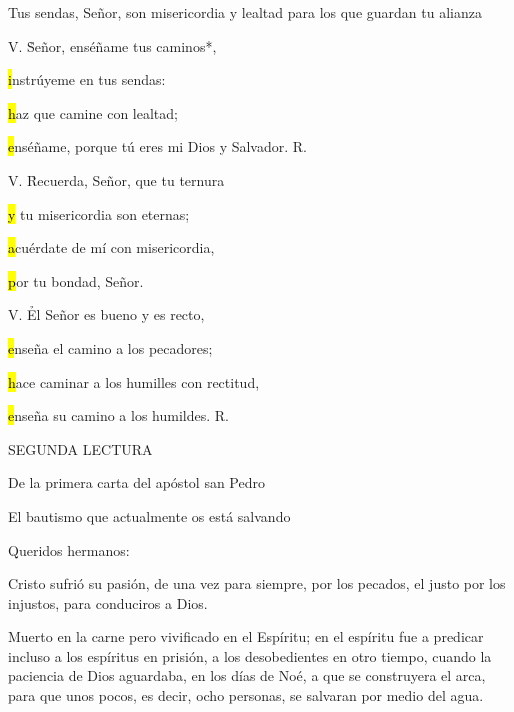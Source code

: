 \begin{readtheme}Tus sendas, Señor, son misericordia y lealtad para los que guardan tu alianza\end{readtheme}

\begin{readbody} 
	\sv V. 	\h Señor, enséñame tus caminos*,\par
			\hl instrúyeme en tus sendas:\par
			\hl haz que camine con lealtad;\par
			\hl enséñame, porque tú eres mi Dios y Salvador. \sr R.\par\par
	\sv V. 	\h Recuerda, Señor, que tu ternura\par
			\hl y tu misericordia son eternas;\par
			\hl acuérdate de mí con misericordia,\par
			\hl por tu bondad, Señor. \par
	\sv V. 	\h El Señor es bueno y es recto,\par
			\hl enseña el camino a los pecadores;\par
			\hl hace caminar a los humilles con rectitud,\par
			\hl enseña su camino a los humildes. \sr R.
\end{readbody}

\begin{readtitle}SEGUNDA LECTURA\end{readtitle}

\begin{readbook}De la primera carta del apóstol san Pedro \end{readbook}

\begin{readtheme}El bautismo que actualmente os está salvando\end{readtheme}

\begin{readbody}Queridos hermanos:\end{readbody}

\begin{readbody}Cristo sufrió su pasión, de una vez para siempre, por los pecados, el justo por los injustos, para conduciros a Dios.\end{readbody}

\begin{readbody}Muerto en la carne pero vivificado en el Espíritu; en el espíritu fue a predicar incluso a los espíritus en prisión, a los desobedientes en otro tiempo, cuando la paciencia de Dios aguardaba, en los días de Noé, a que se construyera el arca, para que unos pocos, es decir, ocho personas, se salvaran por medio del agua.\end{readbody}

